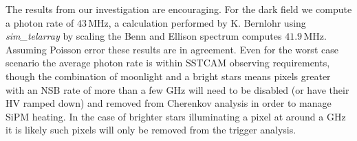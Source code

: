 The results from our investigation are encouraging. For the dark field we compute a photon rate of $\mathrm{43\,MHz}$, a calculation performed by K. Bernlohr using \textit{sim\_telarray} by scaling the Benn and Ellison spectrum \cite{BandE} computes $\mathrm{41.9\,MHz}$. Assuming Poisson error these results are in agreement. Even for the worst case scenario the average photon rate is within SSTCAM observing requirements, though the combination of moonlight and a bright stars means pixels greater with an NSB rate of more than a few GHz will need to be disabled (or have their HV ramped down) and removed from Cherenkov analysis in order to manage SiPM heating. In the case of brighter stars illuminating a pixel at around a GHz it is likely such pixels will only be removed from the trigger analysis.
\begin{table}[t!]
    \centering
    \caption{Observation parameters for the four Eta Carinae Runs.  The observing Altitude (ALT) and Azimuth (AZ) are presented, along with the simulated source Right Ascension (RA) and Declination (DEC). The moonlit Eta Carinae runs are at a low altitude that an IACT would not normally observe at, but since the \textit{nsb} model does not contain a full atmospheric model this is inconsequential. Times are in UTC.}
    \label{tab:etacar_params}
\end{table}

